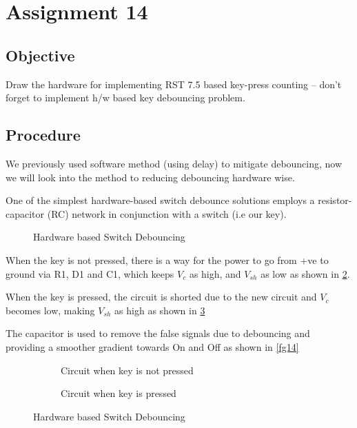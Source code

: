 \documentclass[a4paper]{article} %
\begin{document}
\section[Hardware Debouncing]{Assignment 14} %
    \subsection{Objective}
        Draw the hardware for implementing RST 7.5 based key-press counting -- don't forget to implement h/w based key debouncing problem.
    \subsection{Procedure}
        We previously used software method (using delay) to mitigate debouncing, now we will look into the method to reducing debouncing hardware wise.\par
        One of the simplest hardware-based switch debounce solutions employs a resistor-capacitor (RC) network in conjunction with a switch (i.e our key).

        \begin{figure}[h!]
            \centering
            \caption{Hardware based Switch Debouncing}
            \label{fg12}
        \end{figure}

        When the key is not pressed, there is a way for the power to go from +ve to ground via R1, D1 and C1, which keeps $V_c$ as high, and $V_{sh}$ as low as shown in \ref{fg13a}.\par
        When the key is pressed, the circuit is shorted due to the new circuit and $V_c$ becomes low, making $V_{sh}$ as high as shown in \ref{fg13b}\par
        The capacitor is used to remove the false signals due to debouncing and providing a smoother gradient towards On and Off as shown in \ref{fg14}

        \begin{figure}[h!]
            \centering
            \begin{subfigure}[b]{0.49\linewidth}
                \centering
                \caption{Circuit when key is not pressed}
                \label{fg13a}
            \end{subfigure}
            \begin{subfigure}[b]{0.49\linewidth}
                \centering
                \caption{Circuit when key is pressed}
                \label{fg13b}
            \end{subfigure}
            \caption{Hardware based Switch Debouncing}
            \label{fg13}
        \end{figure}
    \newpage
        
\end{document}
